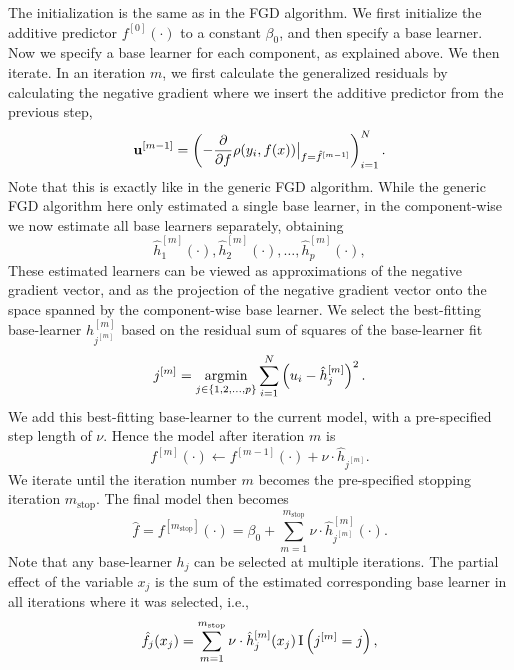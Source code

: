 The initialization is the same as in the FGD algorithm. We first initialize the additive predictor $f^{[0]}(\cdot)$ to a constant $\beta_0$, and then specify a base learner. Now we specify a base learner for each component, as explained above. We then iterate. In an iteration $m$, we first calculate the generalized residuals by calculating the negative gradient where we insert the additive predictor from the previous step,
\begin{equation}
    \mathbf{u}^{[m-1]}=\left(-\frac{\partial}{\partial f}\rho(y_i, f(x))\big\rvert_{f=\hat{f}^{[m-1]}}\right)_{i=1}^N.
\end{equation}
Note that this is exactly like in the generic FGD algorithm. While the generic FGD algorithm here only estimated a single base learner, in the component-wise we now estimate all base learners separately, obtaining
\begin{equation}
    \hat{h}_1^{[m]}(\cdot),\hat{h}_2^{[m]}(\cdot),\ldots,\hat{h}_p^{[m]}(\cdot),
\end{equation}
These estimated learners can be viewed as approximations of the negative gradient vector, and as the projection of the negative gradient vector onto the space spanned by the component-wise base learner. We select the best-fitting base-learner $h_{j^{[m]}}^{[m]}$ based on the residual sum of squares of the base-learner fit
\begin{equation}
    j^{[m]}=\operatorname*{argmin}_{j\in\{1,2,\ldots,p\}}\sum_{i=1}^N \left(u_i-\hat{h}_j^{[m]}\right)^2.
\end{equation}
We add this best-fitting base-learner to the current model, with a pre-specified step length of $\nu$. Hence the model after iteration $m$ is
\begin{equation}
    f^{[m]}(\cdot)\gets f^{[m-1]}(\cdot)+\nu\cdot\hat{h}_{j^{[m]}}.
\end{equation}
We iterate until the iteration number $m$ becomes the pre-specified stopping iteration $m_{\text{stop}}$. The final model then becomes
\begin{equation}
    \hat{f}=f^{[m_{\text{stop}}]}(\cdot)=\beta_0 + \sum_{m=1}^{m_{\text{stop}}}\nu\cdot\hat{h}_{j^{[m]}}^{[m]}(\cdot).
\end{equation}
Note that any base-learner $h_j$ can be selected at multiple iterations. The partial effect of the variable $x_j$ is the sum of the estimated corresponding base learner in all iterations where it was selected, i.e.,
\begin{equation*}
    \hat{f}_j(x_j)=\sum_{m=1}^{m_{\text{stop}}}\nu\cdot\hat{h}_j^{[m]}(x_j)\operatorname{I}\left(j^{[m]}=j\right),
\end{equation*}
